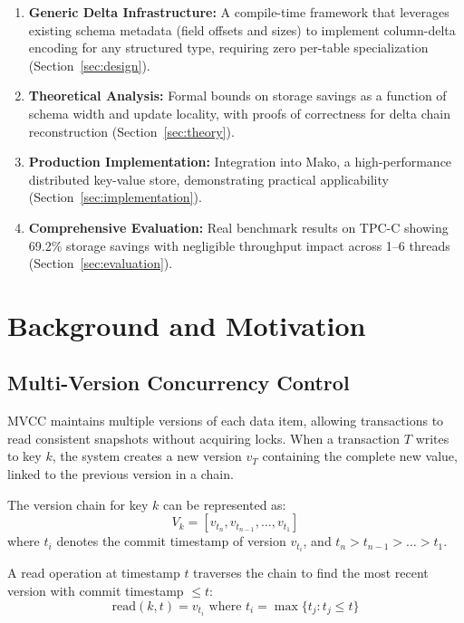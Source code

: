 \documentclass[letterpaper,twocolumn,10pt]{article}
\begin{document}
\begin{enumerate}
\item \textbf{Generic Delta Infrastructure:} A compile-time framework that leverages existing schema metadata (field offsets and sizes) to implement column-delta encoding for any structured type, requiring zero per-table specialization (Section~\ref{sec:design}).

\item \textbf{Theoretical Analysis:} Formal bounds on storage savings as a function of schema width and update locality, with proofs of correctness for delta chain reconstruction (Section~\ref{sec:theory}).

\item \textbf{Production Implementation:} Integration into Mako, a high-performance distributed key-value store, demonstrating practical applicability (Section~\ref{sec:implementation}).

\item \textbf{Comprehensive Evaluation:} Real benchmark results on TPC-C showing 69.2\% storage savings with negligible throughput impact across 1--6 threads (Section~\ref{sec:evaluation}).
\end{enumerate}

\section{Background and Motivation}
\label{sec:background}

\subsection{Multi-Version Concurrency Control}

MVCC maintains multiple versions of each data item, allowing transactions to read consistent snapshots without acquiring locks. When a transaction $T$ writes to key $k$, the system creates a new version $v_T$ containing the complete new value, linked to the previous version in a chain.

The version chain for key $k$ can be represented as:
\[
V_k = [v_{t_n}, v_{t_{n-1}}, \ldots, v_{t_1}]
\]
where $t_i$ denotes the commit timestamp of version $v_{t_i}$, and $t_n > t_{n-1} > \ldots > t_1$.

A read operation at timestamp $t$ traverses the chain to find the most recent version with commit timestamp $\leq t$:
\[
\text{read}(k, t) = v_{t_i} \text{ where } t_i = \max\{t_j : t_j \leq t\}
\]
\end{document}

